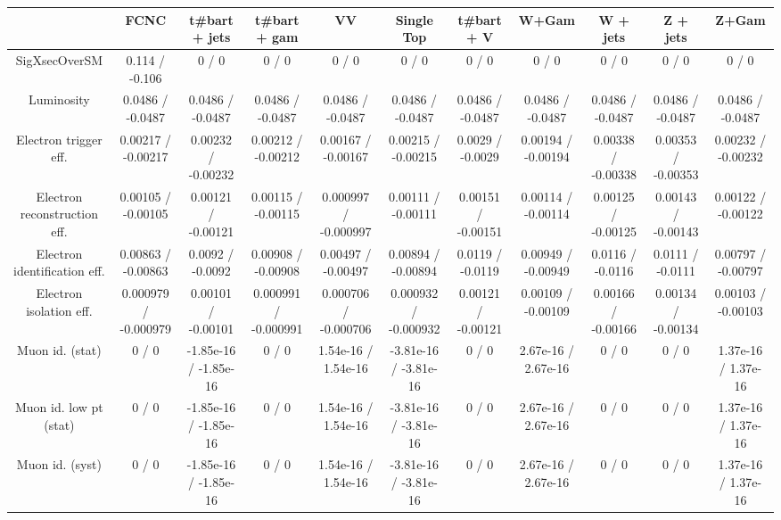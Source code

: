 \begin{table}[htbp]
\begin{center}
\footnotesize
\begin{tabular}{|c|c|c|c|c|c|c|c|c|c|c|}
\hline 
      & FCNC      & t#bar{t} + jets      & t#bar{t} +  gam      & VV      & Single Top      & t#bar{t} + V      & W+Gam      & W + jets      & Z + jets      & Z+Gam \\ 
\hline 
 SigXsecOverSM & 0.114 / -0.106 & 0 / 0 & 0 / 0 & 0 / 0 & 0 / 0 & 0 / 0 & 0 / 0 & 0 / 0 & 0 / 0 & 0 / 0 \\ 
  Luminosity & 0.0486 / -0.0487 & 0.0486 / -0.0487 & 0.0486 / -0.0487 & 0.0486 / -0.0487 & 0.0486 / -0.0487 & 0.0486 / -0.0487 & 0.0486 / -0.0487 & 0.0486 / -0.0487 & 0.0486 / -0.0487 & 0.0486 / -0.0487 \\ 
  Electron trigger eff. & 0.00217 / -0.00217 & 0.00232 / -0.00232 & 0.00212 / -0.00212 & 0.00167 / -0.00167 & 0.00215 / -0.00215 & 0.0029 / -0.0029 & 0.00194 / -0.00194 & 0.00338 / -0.00338 & 0.00353 / -0.00353 & 0.00232 / -0.00232 \\ 
  Electron reconstruction eff. & 0.00105 / -0.00105 & 0.00121 / -0.00121 & 0.00115 / -0.00115 & 0.000997 / -0.000997 & 0.00111 / -0.00111 & 0.00151 / -0.00151 & 0.00114 / -0.00114 & 0.00125 / -0.00125 & 0.00143 / -0.00143 & 0.00122 / -0.00122 \\ 
  Electron identification eff. & 0.00863 / -0.00863 & 0.0092 / -0.0092 & 0.00908 / -0.00908 & 0.00497 / -0.00497 & 0.00894 / -0.00894 & 0.0119 / -0.0119 & 0.00949 / -0.00949 & 0.0116 / -0.0116 & 0.0111 / -0.0111 & 0.00797 / -0.00797 \\ 
  Electron isolation eff. & 0.000979 / -0.000979 & 0.00101 / -0.00101 & 0.000991 / -0.000991 & 0.000706 / -0.000706 & 0.000932 / -0.000932 & 0.00121 / -0.00121 & 0.00109 / -0.00109 & 0.00166 / -0.00166 & 0.00134 / -0.00134 & 0.00103 / -0.00103 \\ 
  Muon id. (stat) & 0 / 0 & -1.85e-16 / -1.85e-16 & 0 / 0 & 1.54e-16 / 1.54e-16 & -3.81e-16 / -3.81e-16 & 0 / 0 & 2.67e-16 / 2.67e-16 & 0 / 0 & 0 / 0 & 1.37e-16 / 1.37e-16 \\ 
  Muon id. low pt (stat) & 0 / 0 & -1.85e-16 / -1.85e-16 & 0 / 0 & 1.54e-16 / 1.54e-16 & -3.81e-16 / -3.81e-16 & 0 / 0 & 2.67e-16 / 2.67e-16 & 0 / 0 & 0 / 0 & 1.37e-16 / 1.37e-16 \\ 
  Muon id. (syst) & 0 / 0 & -1.85e-16 / -1.85e-16 & 0 / 0 & 1.54e-16 / 1.54e-16 & -3.81e-16 / -3.81e-16 & 0 / 0 & 2.67e-16 / 2.67e-16 & 0 / 0 & 0 / 0 & 1.37e-16 / 1.37e-16 \\ 

\end{tabular}
\end{center}
\end{table}
